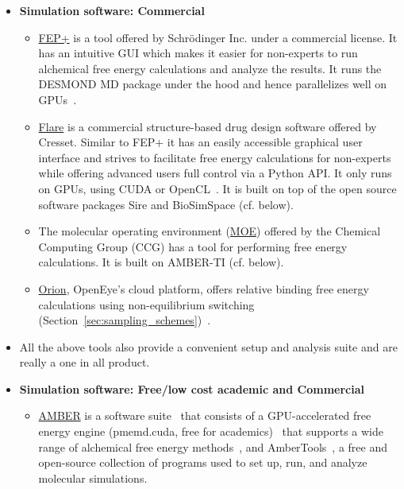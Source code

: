 \documentclass[9pt,bestpractices]{livecoms}
\begin{document}
\begin{itemize}

\item [] \textbf{Simulation software: Commercial}
   \begin{itemize}
    \item \href{https://www.schrodinger.com/fep}{FEP+} is a tool offered by Schr\"{o}dinger Inc. under a commercial license. It has an intuitive GUI which makes it easier for non-experts to run alchemical free energy calculations and analyze the results. It runs the DESMOND MD package under the hood and hence parallelizes well on GPUs~\cite{wang2015accurate}. 
    \item \href{https://www.cresset-group.com/software/flare/}{Flare} is a commercial structure-based drug design software offered by Cresset. Similar to FEP+ it has an easily accessible graphical user interface and strives to facilitate free energy calculations for non-experts while offering advanced users full control via a Python API. It only runs on GPUs, using CUDA or OpenCL~\cite{kuhn2020assessment}. It is built on top of the open source software packages Sire and BioSimSpace (cf. below).
     \item The molecular operating environment (\href{https://www.chemcomp.com/Products.htm}{MOE}) offered by the Chemical Computing Group (CCG) has a tool for performing free energy calculations. It is built on AMBER-TI (cf. below).
    \item \href{https://www.eyesopen.com/orion}{Orion}, OpenEye's cloud platform, offers relative binding free energy calculations using non-equilibrium switching (Section~\ref{sec:sampling_schemes})~\cite{sorensen2024orion}.
    \end{itemize}
    \item[]All the above tools also provide a convenient setup and analysis suite and are really a one in all product. \newline
\item [] \textbf{Simulation software: Free/low cost academic and Commercial}
	\begin{itemize}
    \item \href{https://ambermd.org/}{AMBER} is a software suite~\cite{Case_JChemInfModel_2025_v65_p7835} that consists of a GPU-accelerated free energy engine (pmemd.cuda, free for academics)~\cite{Lee_JChemTheoryComput_2017_v13_p3077,Giese_JChemTheoryComput_2018_v14_p1564,Lee_JChemInfModel_2018_v58_p2043} that supports a wide range of alchemical free energy methods~\cite{tsai2023amber,lee2023aces,zhang_jchemtheorycomput_2024_v20_p3935}, and AmberTools~\cite{case_jcheminfmodel_2023_v63_p6183}, a free and open-source collection of programs used to set up, run, and analyze molecular simulations.

\end{itemize}
\end{itemize}
\end{document}
